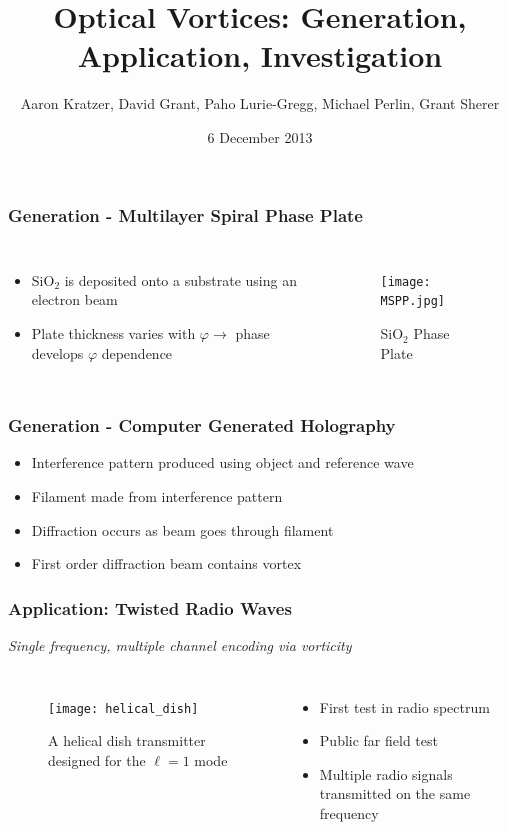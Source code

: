 \documentclass[xcolor=dvipsnames]{beamer}
\title{Optical Vortices: Generation, Application, Investigation}
\author{Aaron Kratzer, David Grant, Paho Lurie-Gregg,
  Michael Perlin, Grant Sherer}
\date{6 December 2013}
\newenvironment{items}[1][]
{\begin{itemize}
    \ifthenelse{\isempty{#1}}
    {\setlength{\itemsep}{12pt}}{\setlength{\itemsep}{#1}}}
  {\end{itemize}}
\renewcommand{\phi}{\varphi} %
\begin{document}
\begin{frame}
  \maketitle
\end{frame}

\begin{frame}
	\frametitle{Generation - Multilayer Spiral Phase Plate}
  \begin{columns}[c]
    \begin{items}
    \item SiO$_2$ is deposited onto a substrate using an electron beam
    \item Plate thickness varies with $\phi\to$ phase
      develops $\phi$ dependence

    \end{items}
    \begin{figure}
      \texttt{[image: MSPP.jpg]}
      \caption{SiO$_2$ Phase Plate}
      \label{MSPP}
    \end{figure}
  \end{columns}
\end{frame}

\begin{frame}
	\frametitle{Generation - Computer Generated Holography}
  \begin{items}
  \item Interference pattern produced using object and reference wave
  \item Filament made from interference pattern
  \item Diffraction occurs as beam goes through filament
  \item First order diffraction beam contains vortex
  \end{items}
\end{frame}

\begin{frame}
	\frametitle{Application: Twisted Radio Waves}
	\begin{center}
		\emph{Single frequency, multiple channel encoding via vorticity}
	\end{center}
  \begin{columns}[c]
    \begin{figure}
      \texttt{[image: helical\_dish]}
      \caption{A helical dish transmitter designed for the $\ell=1$
        mode}
      \label{pic:dish}
    \end{figure}
		\begin{items}
		\item First test in radio spectrum
		\item Public far field test
		\item Multiple radio signals transmitted on the same frequency
		\end{items}
	\end{columns}
\end{frame}
\end{document}
